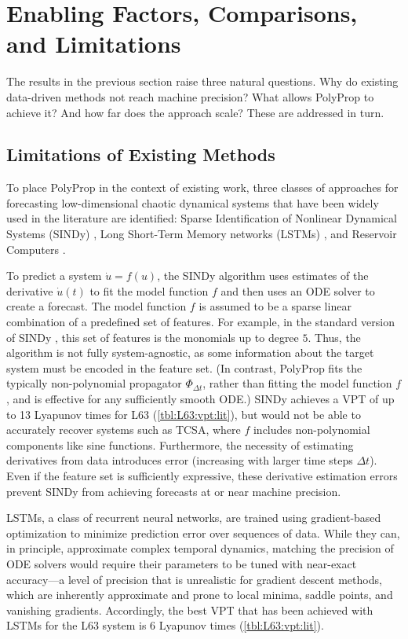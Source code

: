\documentclass{article}
\newcommand{\stepsize}{\Delta\!t}
\begin{document}
%
\section{Enabling Factors, Comparisons, and Limitations}\label{sec:discussion}

The results in the previous section raise three natural questions. Why do existing data-driven methods not reach machine precision? What allows PolyProp to achieve it? And how far does the approach scale? These are addressed in turn.

\subsection{Limitations of Existing Methods}

To place PolyProp in the context of existing work, three classes of approaches for forecasting low-dimensional chaotic dynamical systems that have been widely used in the literature are identified: Sparse Identification of Nonlinear Dynamical Systems (SINDy) \citep{Brunton2015}, Long Short-Term Memory networks (LSTMs) \citep{Hochreiter1997}, and Reservoir Computers \citep{jaeger2001echo}.

To predict a system $\dot u = f(u)$, the SINDy algorithm uses estimates of the derivative $\dot u(t)$ to fit the model function $f$ and then uses an ODE solver to create a forecast. The model function $f$ is assumed to be a sparse linear combination of a predefined set of features. For example, in the standard version of SINDy \citep{Brunton2015}, this set of features is the monomials up to degree $5$. Thus, the algorithm is not fully system-agnostic, as some information about the target system must be encoded in the feature set. (In contrast, PolyProp fits the typically non-polynomial propagator $\Phi_{\stepsize}$, rather than fitting the model function $f$, and is effective for any sufficiently smooth ODE.) SINDy achieves a VPT of up to 13 Lyapunov times for L63 (\cref{tbl:L63:vpt:lit}), but would not be able to accurately recover systems such as TCSA, where $f$ includes non-polynomial components like sine functions. Furthermore, the necessity of estimating derivatives from data introduces error (increasing with larger time steps $\stepsize$). Even if the feature set is sufficiently expressive, these derivative estimation errors prevent SINDy from achieving forecasts at or near machine precision.

LSTMs, a class of recurrent neural networks, are trained using gradient-based optimization to minimize prediction error over sequences of data. While they can, in principle, approximate complex temporal dynamics, matching the precision of ODE solvers would require their parameters to be tuned with near-exact accuracy---a level of precision that is unrealistic for gradient descent methods, which are inherently approximate and prone to local minima, saddle points, and vanishing gradients. Accordingly, the best VPT that has been achieved with LSTMs for the L63 system is 6 Lyapunov times (\cref{tbl:L63:vpt:lit}). 
\end{document}
